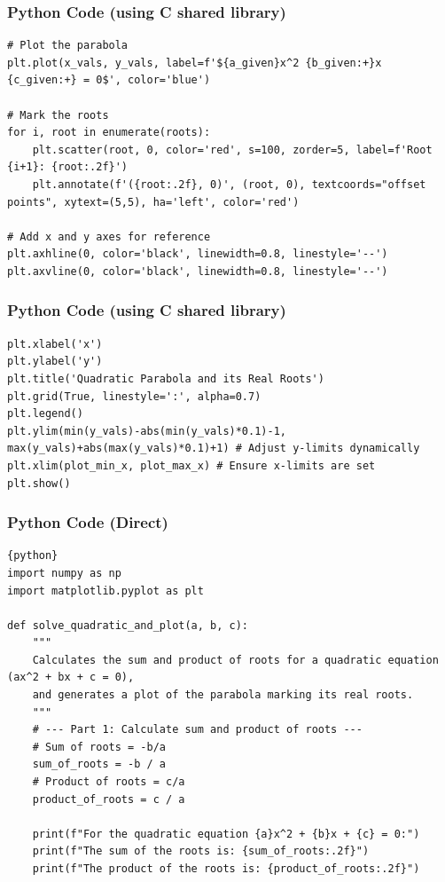 \documentclass{beamer}
\begin{document}
\begin{frame}[fragile]
\frametitle{Python Code (using C shared library)}
\begin{lstlisting}
# Plot the parabola
plt.plot(x_vals, y_vals, label=f'${a_given}x^2 {b_given:+}x {c_given:+} = 0$', color='blue')

# Mark the roots
for i, root in enumerate(roots):
    plt.scatter(root, 0, color='red', s=100, zorder=5, label=f'Root {i+1}: {root:.2f}')
    plt.annotate(f'({root:.2f}, 0)', (root, 0), textcoords="offset points", xytext=(5,5), ha='left', color='red')

# Add x and y axes for reference
plt.axhline(0, color='black', linewidth=0.8, linestyle='--')
plt.axvline(0, color='black', linewidth=0.8, linestyle='--')
\end{lstlisting}
\end{frame}

\begin{frame}[fragile]
\frametitle{Python Code (using C shared library)}
\begin{lstlisting}
plt.xlabel('x')
plt.ylabel('y')
plt.title('Quadratic Parabola and its Real Roots')
plt.grid(True, linestyle=':', alpha=0.7)
plt.legend()
plt.ylim(min(y_vals)-abs(min(y_vals)*0.1)-1, max(y_vals)+abs(max(y_vals)*0.1)+1) # Adjust y-limits dynamically
plt.xlim(plot_min_x, plot_max_x) # Ensure x-limits are set
plt.show()
\end{lstlisting}
\end{frame}

\begin{frame}[fragile]
\frametitle{Python Code (Direct)}
\begin{lstlisting}{python}
import numpy as np
import matplotlib.pyplot as plt

def solve_quadratic_and_plot(a, b, c):
    """
    Calculates the sum and product of roots for a quadratic equation (ax^2 + bx + c = 0),
    and generates a plot of the parabola marking its real roots.
    """
    # --- Part 1: Calculate sum and product of roots ---
    # Sum of roots = -b/a
    sum_of_roots = -b / a
    # Product of roots = c/a
    product_of_roots = c / a

    print(f"For the quadratic equation {a}x^2 + {b}x + {c} = 0:")
    print(f"The sum of the roots is: {sum_of_roots:.2f}")
    print(f"The product of the roots is: {product_of_roots:.2f}")
\end{lstlisting}
\end{frame}
\end{document}
